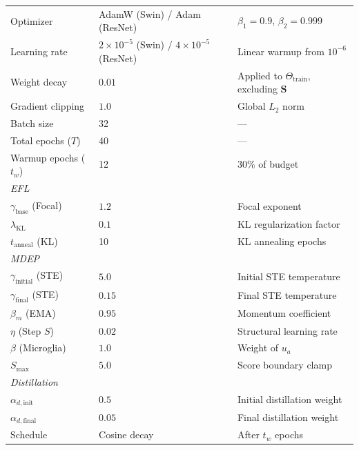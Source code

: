 \documentclass[letterpaper]{article} %
\begin{document}
\begin{table}[t]
\begin{tabular}{@{}lll@{}}
Optimizer & AdamW (Swin) / Adam (ResNet)~\cite{loshchilov2019decoupled, kingma2015adam} & $\beta_1=0.9$, $\beta_2=0.999$ \\
Learning rate & $2 \times 10^{-5}$ (Swin) / $4 \times 10^{-5}$ (ResNet) & Linear warmup from $10^{-6}$ \\
Weight decay & $0.01$ & Applied to $\Theta_{\text{train}}$, excluding $\bm{S}$ \\
Gradient clipping & $1.0$ & Global $L_2$ norm \\
Batch size & 32 & --- \\
Total epochs ($T$) & 40 & --- \\
Warmup epochs ($t_w$) & 12 & 30\% of budget \\
\midrule
\multicolumn{3}{l}{\emph{EFL}} \\
$\gamma_{\text{base}}$ (Focal) & $1.2$ & Focal exponent \\
$\lambda_{\text{KL}}$ & $0.1$ & KL regularization factor \\
$t_{\text{anneal}}$ (KL) & 10 & KL annealing epochs \\
\midrule
\multicolumn{3}{l}{\emph{MDEP}} \\
$\gamma_{\text{initial}}$ (STE) & $5.0$ & Initial STE temperature \\
$\gamma_{\text{final}}$ (STE) & $0.15$ & Final STE temperature \\
$\beta_m$ (EMA) & $0.95$ & Momentum coefficient \\
$\eta$ (Step $S$) & $0.02$ & Structural learning rate \\
$\beta$ (Microglia) & $1.0$ & Weight of $u_a$ \\
$S_{\max}$ & $5.0$ & Score boundary clamp \\
\midrule
\multicolumn{3}{l}{\emph{Distillation}} \\
$\alpha_{d,\text{init}}$ & $0.5$ & Initial distillation weight \\
$\alpha_{d,\text{final}}$ & $0.05$ & Final distillation weight \\
Schedule & Cosine decay & After $t_w$ epochs \\
\bottomrule
\end{tabular}
\end{table}
\end{document}
